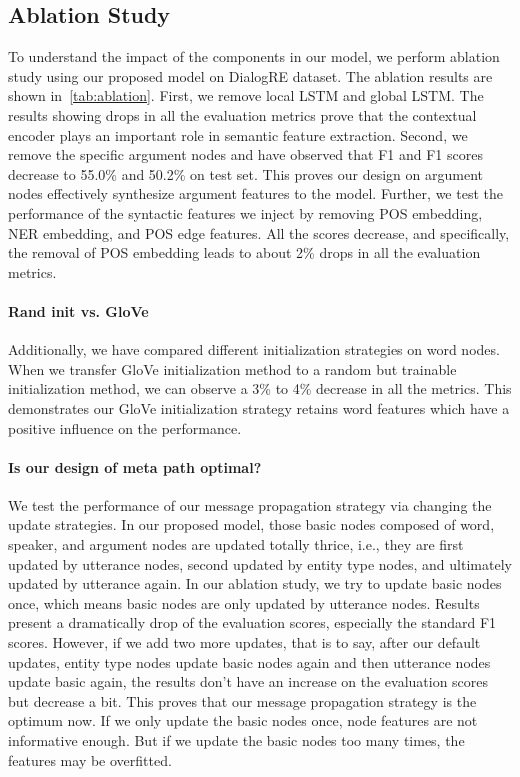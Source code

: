 \documentclass[letterpaper]{article} \usepackage{aaai21}  \usepackage{times}  \usepackage{helvet} \usepackage{courier}  \usepackage[hyphens]{url}  \usepackage{graphicx} \urlstyle{rm} \def\UrlFont{\rm}  \usepackage{natbib}  \usepackage{caption} \frenchspacing  \setlength{\pdfpagewidth}{8.5in}  \setlength{\pdfpageheight}{11in}
\begin{document}
\subsection{Ablation Study}
To understand the impact of the components in our model, we perform ablation study using our proposed model on DialogRE dataset. The ablation results are shown in~\cref{tab:ablation}. First, we remove local LSTM and global LSTM. The results showing drops in all the evaluation metrics prove that the contextual encoder plays an important role in semantic feature extraction. Second, we remove the specific argument nodes and have observed that F1 and F1 scores decrease to 55.0\% and 50.2\% on test set. This proves our design on argument nodes effectively synthesize argument features to the model. Further, we test the performance of the syntactic features we inject by removing POS embedding, NER embedding, and POS edge features. All the scores decrease, and specifically, the removal of POS embedding leads to about 2\% drops in all the evaluation metrics.

\paragraph{Rand init vs. GloVe}
Additionally, we have compared different initialization strategies on word nodes. When we transfer GloVe initialization method to a random but trainable initialization method, we can observe a 3\% to 4\% decrease in all the metrics. This demonstrates our GloVe initialization strategy retains word features which have a positive influence on the performance.

\paragraph{Is our design of meta path optimal?}
We test the performance of our message propagation strategy via changing the update strategies. In our proposed model, those basic nodes composed of word, speaker, and argument nodes are updated totally thrice, i.e., they are first updated by utterance nodes, second updated by entity type nodes, and ultimately updated by utterance again. In our ablation study, we try to update basic nodes once, which means basic nodes are only updated by utterance nodes. Results present a dramatically drop of the evaluation scores, especially the standard F1 scores. However, if we add two more updates, that is to say, after our default updates, entity type nodes update basic nodes again and then utterance nodes update basic again, the results don't have an increase on the evaluation scores but decrease a bit. This proves that our message propagation strategy is the optimum now. If we only update the basic nodes once, node features are not informative enough. But if we update the basic nodes too many times, the features may be overfitted.
\end{document}
